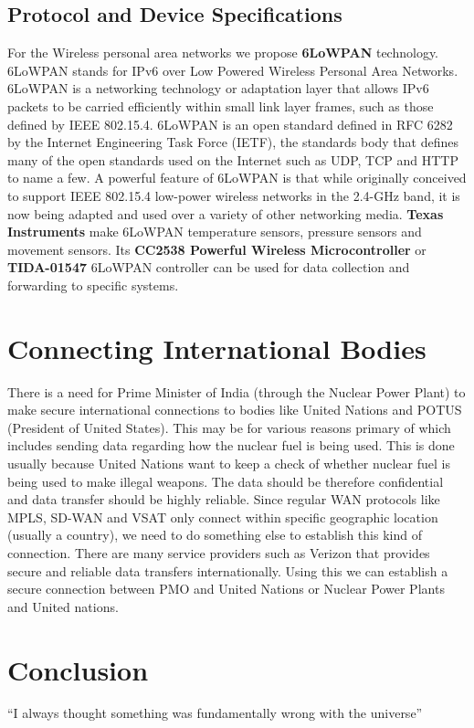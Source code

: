 \documentclass{article}
\begin{document}
\subsection{Protocol and Device Specifications}
For the Wireless personal area networks we propose \textbf{6LoWPAN} technology. 6LoWPAN stands for IPv6 over Low Powered Wireless Personal Area Networks. 6LoWPAN is a networking technology or adaptation layer that allows IPv6 packets to be carried efficiently within small link layer frames, such as those defined by IEEE 802.15.4. 6LoWPAN is an open standard defined in RFC 6282 by the Internet Engineering Task Force (IETF), the standards body that defines many of the open standards used on the Internet such as UDP, TCP and HTTP to name a few. A powerful feature of 6LoWPAN is that while originally conceived to support IEEE 802.15.4 low-power wireless networks in the 2.4-GHz band, it is now being adapted and used over a variety of other networking media. \textbf{Texas Instruments} make 6LoWPAN temperature sensors, pressure sensors and movement sensors. Its \textbf{CC2538 Powerful Wireless Microcontroller} or \textbf{TIDA-01547} 6LoWPAN controller can be used for data collection and forwarding to specific systems.


\section{Connecting International Bodies}
There is a need for Prime Minister of India (through the Nuclear Power Plant) to make secure international connections to bodies like United Nations and POTUS (President of United States). This may be for various reasons primary of which includes sending data regarding how the nuclear fuel is being used. This is done usually because United Nations want to keep a check of whether nuclear fuel is being used to make illegal weapons. The data should be therefore confidential and data transfer should be highly reliable. Since regular WAN protocols like MPLS, SD-WAN and VSAT only connect within specific geographic location (usually a country), we need to do something else to establish this kind of connection. There are many service providers such as Verizon that provides secure and reliable data transfers internationally. Using this we can establish a secure connection between PMO and United Nations or Nuclear Power Plants and United nations.
\section{Conclusion}
``I always thought something was fundamentally wrong with the universe'' \citep{adams1995hitchhiker}



\end{document}
